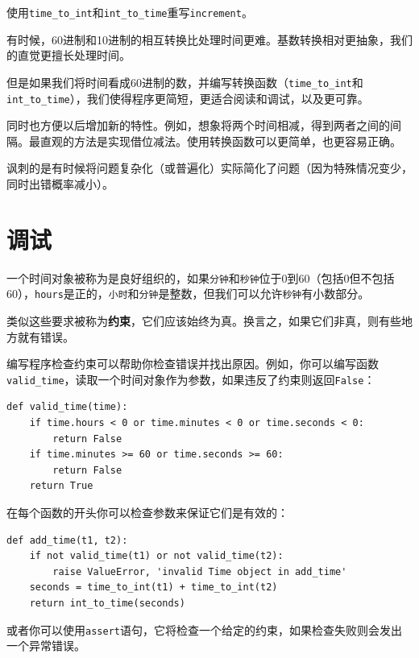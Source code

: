 \begin{ex}
使用\verb"time_to_int"和\verb"int_to_time"重写{\tt increment}。
\end{ex}

有时候，60进制和10进制的相互转换比处理时间更难。基数转换相对更抽象，我们的直觉更擅长处理时间。

但是如果我们将时间看成60进制的数，并编写转换函数（\verb"time_to_int"和\verb"int_to_time"），我们使得程序更简短，更适合阅读和调试，以及更可靠。

同时也方便以后增加新的特性。例如，想象将两个时间相减，得到两者之间的间隔。最直观的方法是实现借位减法。使用转换函数可以更简单，也更容易正确。


讽刺的是有时候将问题复杂化（或普遍化）实际简化了问题（因为特殊情况变少，同时出错概率减小）。


\section{调试}

一个时间对象被称为是良好组织的，如果{\tt 分钟}和{\tt 秒钟}位于0到60（包括0但不包括60），{\tt hours}是正的，{\tt 小时}和{\tt 分钟}是整数，但我们可以允许{\tt 秒钟}有小数部分。


类似这些要求被称为{\bf 约束}，它们应该始终为真。换言之，如果它们非真，则有些地方就有错误。

编写程序检查约束可以帮助你检查错误并找出原因。例如，你可以编写函数\verb"valid_time"，读取一个时间对象作为参数，如果违反了约束则返回{\tt False}：

\beforeverb
\begin{verbatim}
def valid_time(time):
    if time.hours < 0 or time.minutes < 0 or time.seconds < 0:
        return False
    if time.minutes >= 60 or time.seconds >= 60:
        return False
    return True
\end{verbatim}
\afterverb
%
在每个函数的开头你可以检查参数来保证它们是有效的：


\beforeverb
\begin{verbatim}
def add_time(t1, t2):
    if not valid_time(t1) or not valid_time(t2):
        raise ValueError, 'invalid Time object in add_time'
    seconds = time_to_int(t1) + time_to_int(t2)
    return int_to_time(seconds)
\end{verbatim}
\afterverb
%
或者你可以使用{\tt assert}语句，它将检查一个给定的约束，如果检查失败则会发出一个异常错误。

